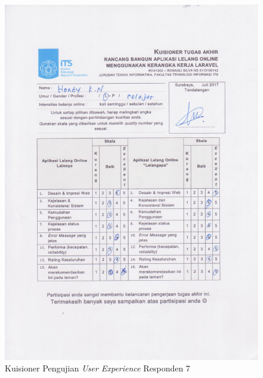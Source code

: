 \begin{figure}[H]
	\centering
	\includegraphics[width=.9\textwidth]{images/bab5/ujipengguna/7.jpg}
	\caption{Kuisioner Pengujian \textit{User Experience} Responden 7}
	\label{quest-7}
\end{figure}
